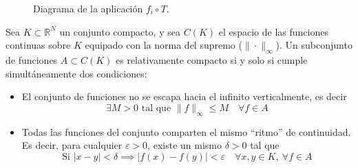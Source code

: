 \begin{ejercicio}
\begin{figure}
    \centering
    \caption{Diagrama de la aplicación $f_i \circ T$.}
    \label{fig:diagrama-ejercicio1}
\end{figure}

\end{ejercicio}


\begin{teo}
    Sea $K \subset \mathbb{R}^N$ un conjunto compacto, y sea $C(K)$ el espacio de las funciones continuas sobre $K$ equipado con la norma del supremo ($\|\cdot\|_\infty$). Un subconjunto de funciones $A \subset C(K)$ es relativamente compacto  si y solo si cumple simultáneamente dos condiciones:
    \begin{itemize}
        \item {} El conjunto de funciones no se escapa hacia el infinito verticalmente, es decir
        \begin{equation*}
            \exists M > 0 \text{ tal que } \|f\|_\infty \leq M \quad \forall f \in A
        \end{equation*}
        \item {} Todas las funciones del conjunto comparten el mismo ``ritmo'' de continuidad. Es decir, para cualquier $\varepsilon > 0$, existe un mismo $\delta > 0$ tal que
        \begin{equation*}
            \text{Si } |x - y| < \delta \implies |f(x) - f(y)| < \varepsilon \quad \forall x,y \in K, \ \forall f \in A
        \end{equation*}
    \end{itemize}
\end{teo}

